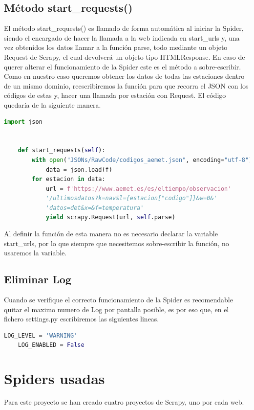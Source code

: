 \subsection{Método start\_requests()}
El método start\_requests() es llamado de forma automática al iniciar la Spider, siendo el encargado de hacer la llamada a la web indicada en start\_urls y, una vez obtenidos los datos llamar a la función parse, todo mediante un objeto Request de Scrapy, el cual devolverá un objeto tipo HTMLResponse. En caso de querer alterar el funcionamiento de la Spider este es el método a sobre-escribir.\newline
\newline
Como en nuestro caso queremos obtener los datos de todas las estaciones dentro de un mismo dominio, reescribiremos la función para que recorra el JSON con los códigos de estas y, hacer una llamada por estación con Request.\newline
\newline
El código quedaría de la siguiente manera.

\begin{lstlisting}[language=Python, caption={Sobre-escritura de start\_request()}]
	import json
	
	
	def start_requests(self):
		with open("JSONs/RawCode/codigos_aemet.json", encoding="utf-8") as f:
			data = json.load(f)
		for estacion in data:
			url = f'https://www.aemet.es/es/eltiempo/observacion'
			'/ultimosdatos?k=nav&l={estacion["codigo"]}&w=0&'
			'datos=det&x=&f=temperatura'
			yield scrapy.Request(url, self.parse)
\end{lstlisting}

Al definir la función de esta manera no es necesario declarar la variable start\_urls, por lo que siempre que necesitemos sobre-escribir la función, no usaremos la variable.

\subsection{Eliminar Log}
Cuando se verifique el correcto funcionamiento de la Spider es recomendable quitar el maximo numero de Log por pantalla posible, es por eso que, en el fichero settings.py escribiremos las siguientes lineas.

\begin{lstlisting}[language=Python, caption={Configurar LOG}]
	LOG_LEVEL = 'WARNING'
	LOG_ENABLED = False
\end{lstlisting}

\section{Spiders usadas}
Para este proyecto se han creado cuatro proyectos de Scrapy, uno por cada web.

